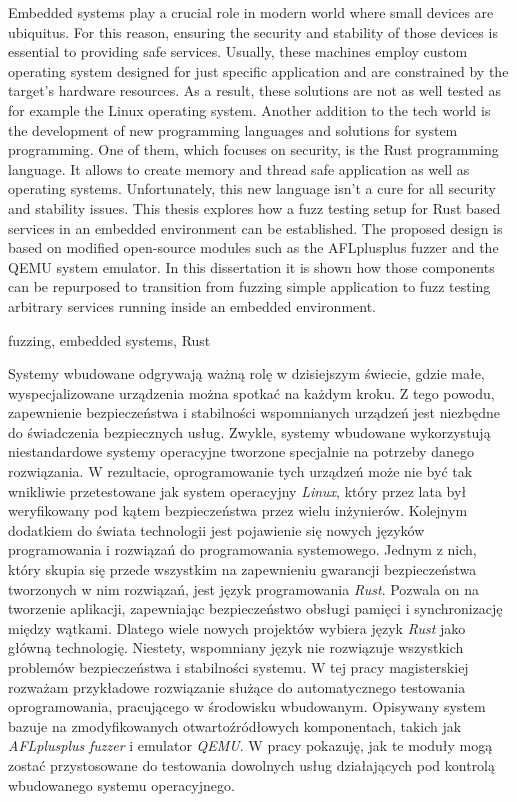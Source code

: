 \documentclass[
    bindingoffset=5mm,  %
    footnoteindent=3mm, %
    hyphenation=true    %
]{src/wut-thesis}
\begin{document}
Embedded systems play a crucial role in modern world where small devices
are ubiquitus. For this reason, ensuring the security and stability of those
devices is essential to providing safe services. Usually, these machines employ custom operating system designed for just speciﬁc application and are constrained by the target’s hardware resources. As a result, these solutions are not as well tested as for example the Linux operating system.
Another addition to the tech world is the development of new programming languages
and solutions for system programming. One of them, which focuses on security, is the
Rust programming language. It allows to create memory and thread safe application
as well as operating systems. Unfortunately, this new language isn’t a cure for all security and stability
issues. This thesis explores how a fuzz testing setup for Rust based services in an embedded environment can be established. The proposed design is based on modiﬁed open-source modules
such as the AFLplusplus fuzzer and the QEMU system emulator. In this dissertation it
is shown how those components can be repurposed to transition from fuzzing simple
application to fuzz testing arbitrary services running inside an embedded environment.

\keywords fuzzing, embedded systems, Rust

\clearpage
\secondabstract
Systemy wbudowane odgrywają ważną rolę w dzisiejszym świecie, gdzie małe, wyspecjalizowane urządzenia można spotkać na każdym kroku. Z tego powodu, zapewnienie bezpieczeństwa i stabilności wspomnianych urządzeń jest niezbędne do świa\-dczenia bezpiecznych usług. Zwykle, systemy wbudowane wykorzystują nie\-stan\-da\-rdo\-we systemy operacyjne tworzone specjalnie na potrzeby danego rozwiązania. W rezultacie, oprogramowanie tych urządzeń może nie być tak wnikliwie przetestowane jak system ope\-racyjny \textit{Linux}, który przez lata był weryfikowany pod kątem bezpieczeństwa przez wielu inżynierów. Kolejnym dodatkiem do świata technologii jest pojawienie się nowych języków programowania i rozwiązań do programowania systemowego. Jednym z nich, który skupia się przede wszystkim na zapewnieniu gwarancji bezpieczeństwa tworzonych w nim rozwiązań, jest język programowania \textit{Rust}. Pozwala on na tworzenie aplikacji, zape\-wniając bezpieczeństwo obsługi pamięci i synchronizację między wątkami. Dlatego wiele nowych projektów wybiera język \textit{Rust} jako główną technologię. Niestety, wspo\-mniany język nie rozwiązuje wszystkich problemów bezpieczeństwa i stabilności systemu. W tej pracy magisterskiej rozważam przykładowe rozwiązanie służące do automatycznego testowania oprogramowania, pracującego w środowisku wbudowanym. Opisywany system bazuje na zmodyfikowanych otwartoźródłowych komponentach, takich jak \textit{AFLplusplus} \textit{fuzzer} i emu\-lator \textit{QEMU}. W pracy pokazuję, jak te moduły mogą zostać przystosowane do testowania dowolnych usług działających pod kontrolą wbudowanego systemu operacyjnego.
\end{document}

